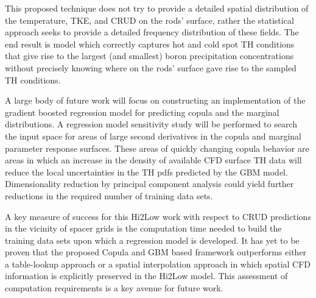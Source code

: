 
This proposed technique does not try to provide a detailed spatial distribution
of the temperature, TKE, and CRUD on the rods' surface, rather the
statistical approach seeks to provide a detailed frequency distribution
of these fields.  The end result is model which correctly captures hot and cold
spot TH conditions that give rise to the largest (and smallest) boron
precipitation concentrations without precisely knowing where on the rods'
surface gave rise to the sampled TH conditions.

A large body of future work will focus on constructing an implementation of the gradient boosted regression model
for predicting copula and the marginal distributions.  A regression model sensitivity study will be performed to search the input space for areas of large second derivatives in the copula and marginal parameter response surfaces.  These areas of quickly changing copula behavior are areas in which an increase in the density of available CFD surface TH data will reduce the local uncertainties in the TH pdfs predicted by the GBM model.  Dimensionality reduction by principal component analysis could yield further reductions in the required number of training data sets. 

A key measure of success for this Hi2Low work with respect to  CRUD predictions
in the vicinity of spacer grids is the computation time needed to build the
training data sets upon which a regression model is developed.
It has yet to be proven that the proposed Copula and GBM based framework outperforms
either a table-lookup approach or a spatial interpolation approach in which
spatial CFD information is explicitly preserved in the Hi2Low model.  This assessment
of computation requirements is a key avenue for future work.